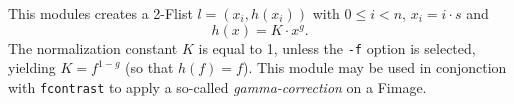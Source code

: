 This modules creates a 2-Flist $l=(x_i,h(x_i))$ with $0\leq i<n$,
$x_i = i\cdot s$ and 
$$h(x) = K\cdot x^g.$$
The normalization constant $K$ is equal to 1, unless the \verb+-f+
option is selected, yielding $K=f^{1-g}$ (so that $h(f)=f$).
This module may be used in conjonction with \verb+fcontrast+ to apply
a so-called {\it gamma-correction} on a Fimage.
